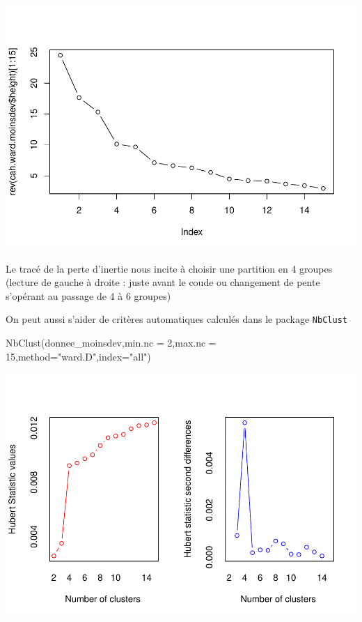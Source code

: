 \documentclass[
]{article}
\newenvironment{Shaded}{}{}
\newcommand{\AttributeTok}[1]{#1}
\newcommand{\DecValTok}[1]{#1}
\newcommand{\FunctionTok}[1]{#1}
\newcommand{\NormalTok}[1]{#1}
\newcommand{\StringTok}[1]{\textcolor[rgb]{0.00,0.50,0.50}{#1}}
\begin{document}
\includegraphics{Projet_files/figure-latex/unnamed-chunk-32-1.pdf}

Le tracé de la perte d'inertie nous incite à choisir une partition en 4
groupes (lecture de gauche à droite : juste avant le coude ou changement
de pente s'opérant au passage de 4 à 6 groupes)

On peut aussi s'aider de critères automatiques calculés dans le package
\texttt{NbClust}

\begin{Shaded}
\begin{Highlighting}[]
\FunctionTok{NbClust}\NormalTok{(donnee\_moinsdev,}\AttributeTok{min.nc =} \DecValTok{2}\NormalTok{,}\AttributeTok{max.nc =} \DecValTok{15}\NormalTok{,}\AttributeTok{method=}\StringTok{"ward.D"}\NormalTok{,}\AttributeTok{index=}\StringTok{"all"}\NormalTok{)}
\end{Highlighting}
\end{Shaded}

\includegraphics{Projet_files/figure-latex/unnamed-chunk-33-1.pdf}
\end{document}
